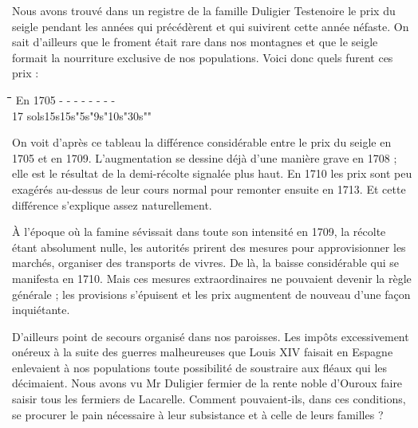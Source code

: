 Nous avons trouvé dans un registre de la famille Duligier Testenoire le prix du seigle pendant les années qui précédèrent et qui suivirent cette année néfaste. On sait d'ailleurs que le froment était rare dans nos montagnes et que le seigle formait la nourriture exclusive de nos populations. Voici donc quels furent ces prix :
\begin{tabbing}
\small
\hspace{0.14\textwidth}\=\hspace{0.105\textwidth}\=\hspace{0.105\textwidth}\=\hspace{0.105\textwidth}\=\hspace{0.105\textwidth}\=\hspace{0.105\textwidth}\=\hspace{0.105\textwidth}\=\hspace{0.105\textwidth}\=\kill
En 1705 - - - - - - - -\\
17 sols\>15s\>15s"5s"9s"10s"30s""
\end{tabbing}

On voit d'après ce tableau la différence considérable entre le prix du seigle en 1705 et en 1709. L'augmentation se dessine déjà d'une manière grave en 1708 ; elle est le résultat de la demi-récolte signalée plus haut. En 1710 les prix sont peu exagérés au-dessus de leur cours normal pour remonter ensuite en 1713. Et cette différence s'explique assez naturellement.

À l'époque où la famine sévissait dans toute son intensité en 1709, la récolte étant absolument nulle, les autorités prirent des mesures pour approvisionner les marchés, organiser des transports de vivres. De là, la baisse considérable qui se manifesta en 1710. Mais ces mesures extraordinaires ne pouvaient devenir la règle générale ; les provisions s'épuisent et les prix augmentent de nouveau d'une façon inquiétante.

D'ailleurs point de secours organisé dans nos paroisses. Les impôts excessivement onéreux à la suite des guerres malheureuses que Louis XIV faisait en Espagne enlevaient à nos populations toute possibilité de soustraire aux fléaux qui les décimaient. Nous avons vu Mr Duligier fermier de la rente noble d'Ouroux faire saisir tous les fermiers de Lacarelle. Comment pouvaient-ils, dans ces conditions, se procurer le pain nécessaire à leur subsistance et à celle de leurs familles ?

